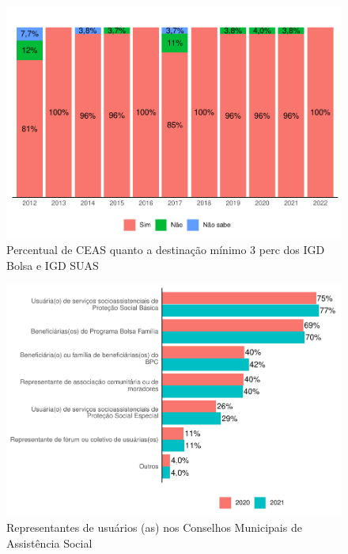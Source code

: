 \documentclass[
  brazilian]{report}
\begin{document}
\begin{figure}
\includegraphics{Censo-SUAS-2022_files/figure-latex/ceas_igd-1} \caption[Percentual de CEAS quanto a destinação mínimo 3 perc dos IGD Bolsa e IGD SUAS]{Percentual de CEAS quanto a destinação mínimo 3 perc dos IGD Bolsa e IGD SUAS}\label{fig:ceas_igd}
\end{figure}

\begin{figure}
\includegraphics{Censo-SUAS-2022_files/figure-latex/usu_cmun-1} \caption[Representantes de usuários (as) nos Conselhos Municipais de Assistência Social]{Representantes de usuários (as) nos Conselhos Municipais de Assistência Social}\label{fig:usu_cmun}
\end{figure}
\end{document}
